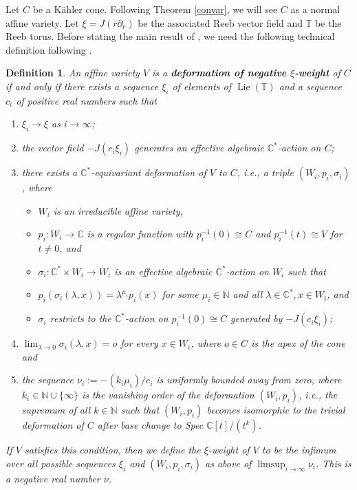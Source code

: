 \documentclass[a4paper,11pt]{article}
\newcounter{mythm}[section]
\newtheorem{defi}[mythm]{Definition}
\begin{document}
Let $C$ be a Kähler cone. Following Theorem \ref{convar}, we will see $C$ as a normal affine variety. Let $\xi = J(r \partial_r)$ be the associated Reeb vector field and $\mathbb{T}$ be the Reeb torus. Before stating the main result of \cite{conlon_classification_2024}, we need the following technical definition following \cite[Definition 1.7]{conlon_classification_2024}. 

\begin{defi} \label{deformation of negative weight}
 An affine variety $V$ is a \textbf{deformation of negative $\xi$-weight} of $C$ if and only if there exists a sequence $\xi_i$ of elements of $\operatorname{Lie}(\mathbb{T})$ and a sequence $c_i$ of positive real numbers such that
 \begin{enumerate}
\item  $\xi_i \rightarrow \xi$ as $i \rightarrow \infty$;
\item  the vector field $-J\left(c_i \xi_i\right)$ generates an effective algebraic $\mathbb{C}^*$-action on $C$;
\item  there exists a $\mathbb{C}^*$-equivariant deformation of $V$ to $C$, i.e., a triple $\left(W_i, p_i, \sigma_i\right)$, where
\begin{itemize}
\item  $W_i$ is an irreducible affine variety,
\item $p_i: W_i \rightarrow \mathbb{C}$ is a regular function with $p_i^{-1}(0) \cong C$ and $p_i^{-1}(t) \cong V$ for $t \neq 0$, and
\item $\sigma_i: \mathbb{C}^* \times W_i \rightarrow W_i$ is an effective algebraic $\mathbb{C}^*$-action on $W_i$ such that
\item $p_i\left(\sigma_i(\lambda, x)\right)=\lambda^{\mu_i} p_i(x)$ for some $\mu_i \in \mathbb{N}$ and all $\lambda \in \mathbb{C}^*, x \in W_i$, and
\item $\sigma_i$ restricts to the $\mathbb{C}^*$-action on $p_i^{-1}(0) \cong C$ generated by $-J\left(c_i \xi_i\right)$;
\end{itemize}
\item  $\lim _{\lambda \rightarrow 0} \sigma_i(\lambda, x)=o$ for every $x \in W_i$, where $o \in C$ is the apex of the cone and 
\item the sequence $\nu_i:=-\left(k_i \mu_i\right) / c_i$ is uniformly bounded away from zero, where $k_i \in \mathbb{N} \cup\{\infty\}$ is the vanishing order of the deformation $\left(W_i, p_i\right)$, i.e., the supremum of all $k \in \mathbb{N}$ such that $\left(W_i, p_i\right)$ becomes isomorphic to the trivial deformation of $C$ after base change to Spec $\mathbb{C}[t] /\left(t^k\right)$.
 \end{enumerate}
If $V$ satisfies this condition, then we define the $\xi$-weight of $V$ to be the infimum over all possible sequences $\xi_i$ and $\left(W_i, p_i, \sigma_i\right)$ as above of $\limsup _{i \rightarrow \infty} \nu_i$. This is a negative real number $\nu$.
\end{defi}
\end{document}
